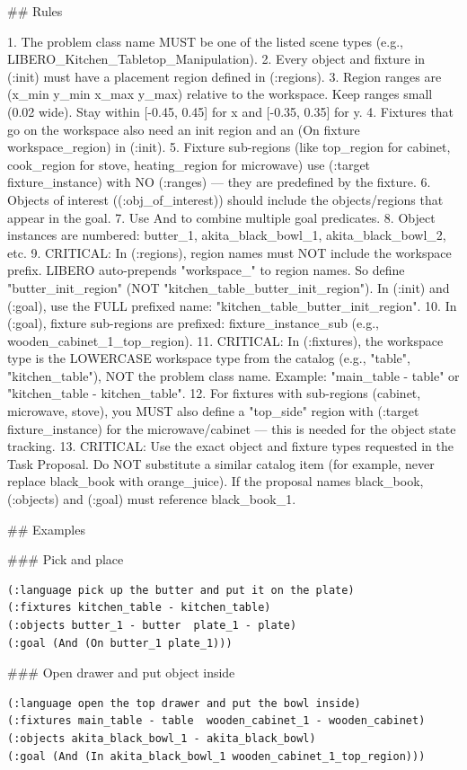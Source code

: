 \documentclass{llmxive}
\begin{document}
## Rules

1. The problem class name MUST be one of the listed scene types (e.g.,
LIBERO_Kitchen_Tabletop_Manipulation).
2. Every object and fixture in (:init) must have a placement region defined
in (:regions).
3. Region ranges are (x_min y_min x_max y_max) relative to the workspace.
Keep ranges small (0.02 wide). Stay within [-0.45, 0.45] for x and [-0.35,
0.35] for y.
4. Fixtures that go on the workspace also need an init region and an (On
fixture workspace_region) in (:init).
5. Fixture sub-regions (like top_region for cabinet, cook_region for stove,
heating_region for microwave) use (:target fixture_instance) with NO
(:ranges) — they are predefined by the fixture.
6. Objects of interest ((:obj_of_interest)) should include the
objects/regions that appear in the goal.
7. Use And to combine multiple goal predicates.
8. Object instances are numbered: butter_1, akita_black_bowl_1,
akita_black_bowl_2, etc.
9. CRITICAL: In (:regions), region names must NOT include the workspace
prefix. LIBERO auto-prepends "{workspace}_" to region names. So define
"butter_init_region" (NOT "kitchen_table_butter_init_region"). In (:init)
and (:goal), use the FULL prefixed name: "kitchen_table_butter_init_region".
10. In (:goal), fixture sub-regions are prefixed: {fixture_instance}_{sub}
(e.g., wooden_cabinet_1_top_region).
11. CRITICAL: In (:fixtures), the workspace type is the LOWERCASE workspace
type from the catalog (e.g., "table", "kitchen_table"), NOT the problem
class name. Example: "main_table - table" or "kitchen_table -
kitchen_table".
12. For fixtures with sub-regions (cabinet, microwave, stove), you MUST also
define a "top_side" region with (:target fixture_instance) for the
microwave/cabinet — this is needed for the object state tracking.
13. CRITICAL: Use the exact object and fixture types requested in the Task
Proposal. Do NOT substitute a similar catalog item (for example, never
replace black_book with orange_juice). If the proposal names black_book,
(:objects) and (:goal) must reference black_book_1.

## Examples

### Pick and place
\begin{lstlisting}
(:language pick up the butter and put it on the plate)
(:fixtures kitchen_table - kitchen_table)
(:objects butter_1 - butter  plate_1 - plate)
(:goal (And (On butter_1 plate_1)))
\end{lstlisting}

### Open drawer and put object inside
\begin{lstlisting}
(:language open the top drawer and put the bowl inside)
(:fixtures main_table - table  wooden_cabinet_1 - wooden_cabinet)
(:objects akita_black_bowl_1 - akita_black_bowl)
(:goal (And (In akita_black_bowl_1 wooden_cabinet_1_top_region)))
\end{lstlisting}
\end{document}
